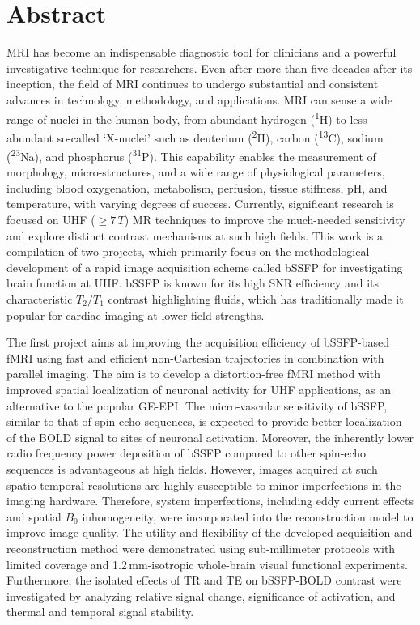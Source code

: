 
\chapter{Abstract}

\Gls{MRI} has become an indispensable diagnostic tool for clinicians and a powerful investigative technique for researchers. Even after more than five decades after its inception, the field of MRI continues to undergo substantial and consistent advances in technology, methodology, and applications. \Gls{MRI} can sense a wide range of nuclei in the human body, from abundant hydrogen (\textsuperscript{1}H) to less abundant so-called ‘X-nuclei’ such as deuterium (\textsuperscript{2}H), carbon (\textsuperscript{13}C), sodium (\textsuperscript{23}Na), and phosphorus (\textsuperscript{31}P). This capability enables the measurement of morphology, micro-structures, and a wide range of physiological parameters, including blood oxygenation, metabolism, perfusion, tissue stiffness, pH, and temperature, with varying degrees of success. Currently, significant research is focused on \gls{UHF} ($\geq 7\,T$) MR techniques to improve the much-needed sensitivity and explore distinct contrast mechanisms at such high fields. This work is a compilation of two projects, which primarily focus on the methodological development of a rapid image acquisition scheme called \gls{bSSFP} for investigating brain function at \gls{UHF}. \Gls{bSSFP} is known for its high \gls{SNR} efficiency and its characteristic $T_2/T_1$ contrast highlighting fluids, which has traditionally made it popular for cardiac imaging at lower field strengths. 

The first project aims at improving the acquisition efficiency of bSSFP-based \gls{fMRI} using fast and efficient non-Cartesian trajectories in combination with parallel imaging. The aim is to develop a distortion-free \gls{fMRI} method with improved spatial localization of neuronal activity for \gls{UHF} applications, as an alternative to the popular \gls{GE}-\gls{EPI}. The micro-vascular sensitivity of \gls{bSSFP}, similar to that of spin echo sequences, is expected to provide better localization of the \gls{BOLD} signal to sites of neuronal activation. Moreover, the inherently lower radio frequency power deposition of \gls{bSSFP} compared to other spin-echo sequences is advantageous at high fields. However, images acquired at such spatio-temporal resolutions are highly susceptible to minor imperfections in the imaging hardware. Therefore, system imperfections, including eddy current effects and spatial $B_0$ inhomogeneity, were incorporated into the reconstruction model to improve image quality. The utility and flexibility of the developed acquisition and reconstruction method were demonstrated using sub-millimeter protocols with limited coverage and 1.2\,mm-isotropic whole-brain visual functional experiments. Furthermore, the isolated effects of \gls{TR} and \gls{TE} on \gls{bSSFP}-\gls{BOLD} contrast were investigated by analyzing relative signal change, significance of activation, and thermal and temporal signal stability.

